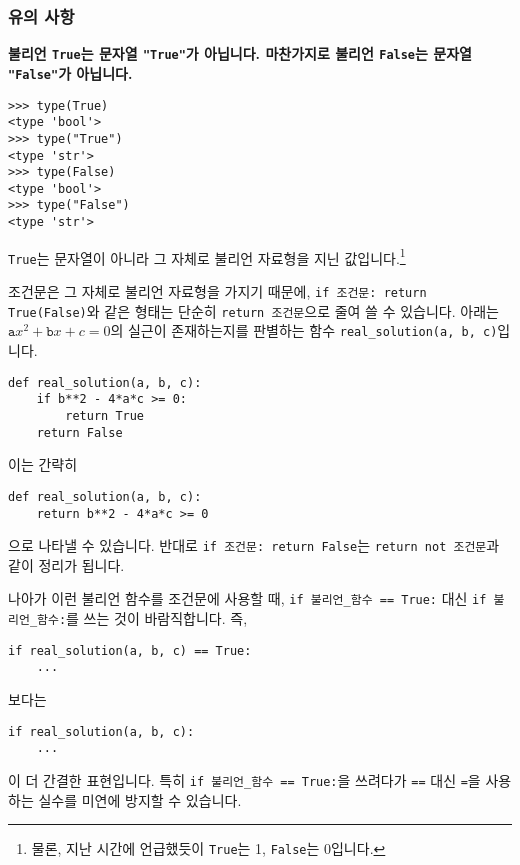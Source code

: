 \documentclass[../main.tex]{subfiles}
\begin{document}
\subsubsection{유의 사항}
\textbf{불리언 \texttt{True}는 문자열 \texttt{"True"}가 아닙니다.
마찬가지로 불리언 \texttt{False}는 문자열 \texttt{"False"}가 아닙니다.}
\begin{verbatim}
>>> type(True)
<type 'bool'>
>>> type("True")
<type 'str'>
>>> type(False)
<type 'bool'>
>>> type("False")
<type 'str'>
\end{verbatim}
\texttt{True}는 문자열이 아니라 그 자체로 불리언 자료형을 지닌 값입니다.\footnote{물론, 지난 시간에 언급했듯이 \texttt{True}는 1, \texttt{False}는 0입니다.}

조건문은 그 자체로 불리언 자료형을 가지기 때문에, \texttt{if 조건문: return True(False)}와 같은 형태는 단순히 \texttt{return 조건문}으로 줄여 쓸 수 있습니다.
아래는 $\texttt{a}x^2 + \texttt{b}x + c = 0$의 실근이 존재하는지를 판별하는 함수 \texttt{real\_solution(a, b, c)}입니다.
\begin{verbatim}
def real_solution(a, b, c):
	if b**2 - 4*a*c >= 0:
		return True
	return False
\end{verbatim}
이는 간략히 
\begin{verbatim}
def real_solution(a, b, c):
	return b**2 - 4*a*c >= 0
\end{verbatim}
으로 나타낼 수 있습니다.
반대로 \texttt{if 조건문: return False}는 \texttt{return not 조건문}과 같이 정리가 됩니다.

나아가 이런 불리언 함수를 조건문에 사용할 때, \texttt{if 불리언\_함수 == True:} 대신 \texttt{if 불리언\_함수:}를 쓰는 것이 바람직합니다.
즉,
\begin{verbatim}
if real_solution(a, b, c) == True:
	...
\end{verbatim}
보다는
\begin{verbatim}
if real_solution(a, b, c):
	...
\end{verbatim}
이 더 간결한 표현입니다.
특히 \texttt{if 불리언\_함수 == True:}을 쓰려다가 \texttt{==} 대신 \texttt{=}을 사용하는 실수를 미연에 방지할 수 있습니다.
\end{document}
